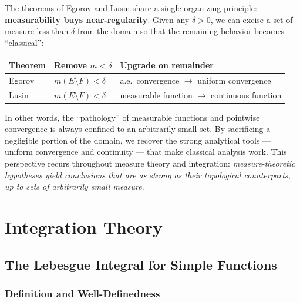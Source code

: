 \documentclass[11pt]{report}
\begin{document}
\begin{rembox}
The theorems of Egorov and Lusin share a single organizing principle: \textbf{measurability buys near-regularity}. Given any $\delta > 0$, we can excise a set of measure less than $\delta$ from the domain so that the remaining behavior becomes ``classical'':

\begin{center}
\renewcommand{\arraystretch}{1.4}
\begin{tabular}{lll}
\textbf{Theorem} & \textbf{Remove $m < \delta$} & \textbf{Upgrade on remainder} \\
\hline
Egorov & $m(E \setminus F) < \delta$ & a.e.\ convergence $\to$ uniform convergence \\
Lusin & $m(E \setminus F) < \delta$ & measurable function $\to$ continuous function \\
\end{tabular}
\end{center}

In other words, the ``pathology'' of measurable functions and pointwise convergence is always confined to an arbitrarily small set. By sacrificing a negligible portion of the domain, we recover the strong analytical tools --- uniform convergence and continuity --- that make classical analysis work. This perspective recurs throughout measure theory and integration: \textit{measure-theoretic hypotheses yield conclusions that are as strong as their topological counterparts, up to sets of arbitrarily small measure}.
\end{rembox}


\chapter{Integration Theory}

\section{The Lebesgue Integral for Simple Functions}

\subsection{Definition and Well-Definedness}
\end{document}
